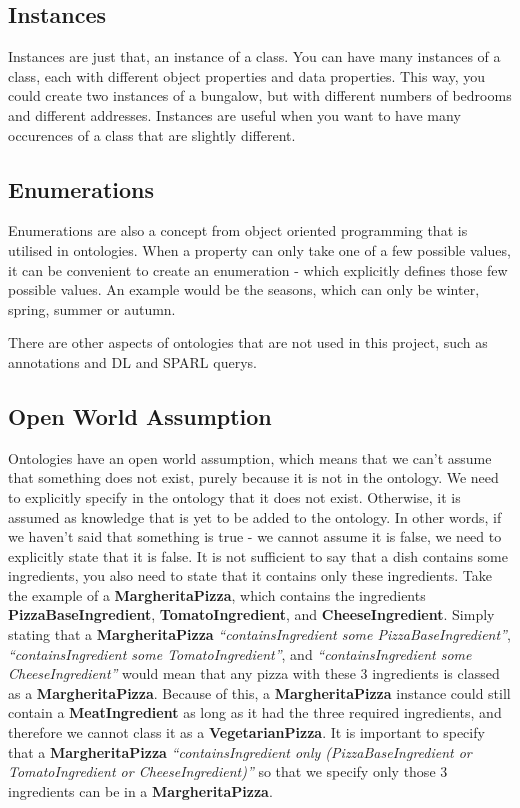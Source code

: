 \subsection{Instances}

Instances are just that, an instance of a class. You can have many instances of a class, each with different object properties and data properties. This way, you could create two instances of a bungalow, but with different numbers of bedrooms and different addresses. Instances are useful when you want to have many occurences of a class that are slightly different.

\subsection{Enumerations}

Enumerations are also a concept from object oriented programming that is utilised in ontologies. When a property can only take one of a few possible values, it can be convenient to create an enumeration - which explicitly defines those few possible values. An example would be the seasons, which can only be winter, spring, summer or autumn.

There are other aspects of ontologies that are not used in this project, such as annotations and DL and SPARL querys.

\subsection{Open World Assumption}

Ontologies have an open world assumption, which means that we can't assume that something does not exist, purely because it is not in the ontology. We need to explicitly specify in the ontology that it does not exist. Otherwise, it is assumed as knowledge that is yet to be added to the ontology. In other words, if we haven't said that something is true - we cannot assume it is false, we need to explicitly state that it is false. It is not sufficient to say that a dish contains some ingredients, you also need to state that it contains only these ingredients. Take the example of a \textbf{MargheritaPizza}, which contains the ingredients \textbf{PizzaBaseIngredient}, \textbf{TomatoIngredient}, and \textbf{CheeseIngredient}. Simply stating that a \textbf{MargheritaPizza} \textit{``containsIngredient some PizzaBaseIngredient''}, \textit{``containsIngredient some TomatoIngredient''}, and \textit{``containsIngredient some CheeseIngredient''} would mean that any pizza with these 3 ingredients is classed as a \textbf{MargheritaPizza}. Because of this, a \textbf{MargheritaPizza} instance could still contain a \textbf{MeatIngredient} as long as it had the three required ingredients, and therefore we cannot class it as a \textbf{VegetarianPizza}. It is important to specify that a \textbf{MargheritaPizza} \textit{``containsIngredient only (PizzaBaseIngredient or TomatoIngredient or CheeseIngredient)''} so that we specify only those 3 ingredients can be in a \textbf{MargheritaPizza}. 

